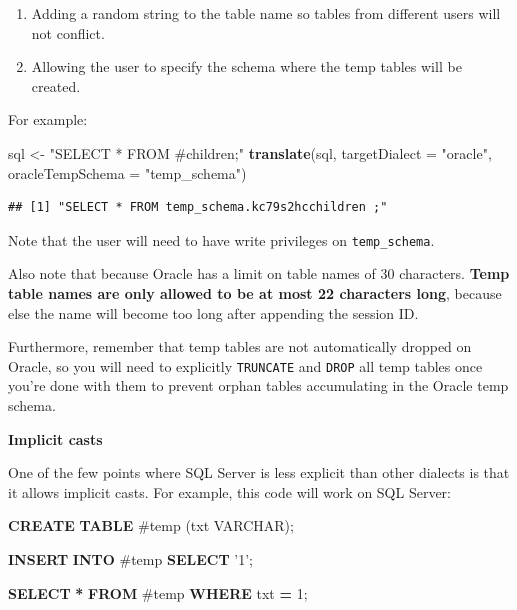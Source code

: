 \documentclass[11pt]{book}
\newenvironment{Shaded}{\begin{snugshade}}{\end{snugshade}}
\newcommand{\DataTypeTok}[1]{\textcolor[rgb]{0.13,0.29,0.53}{#1}}
\newcommand{\DecValTok}[1]{\textcolor[rgb]{0.00,0.00,0.81}{#1}}
\newcommand{\KeywordTok}[1]{\textcolor[rgb]{0.13,0.29,0.53}{\textbf{#1}}}
\newcommand{\NormalTok}[1]{#1}
\newcommand{\OperatorTok}[1]{\textcolor[rgb]{0.81,0.36,0.00}{\textbf{#1}}}
\newcommand{\StringTok}[1]{\textcolor[rgb]{0.31,0.60,0.02}{#1}}
\providecommand{\tightlist}{%
  \setlength{\itemsep}{0pt}\setlength{\parskip}{0pt}}
\theoremstyle{definition}
\theoremstyle{definition}
\theoremstyle{definition}
\theoremstyle{remark}
\begin{document}
\begin{enumerate}
\def\labelenumi{\arabic{enumi}.}
\tightlist
\item
  Adding a random string to the table name so tables from different users will not conflict.
\item
  Allowing the user to specify the schema where the temp tables will be created.
\end{enumerate}

For example:

\begin{Shaded}
\begin{Highlighting}[]
\NormalTok{sql <-}\StringTok{ "SELECT * FROM #children;"}
\KeywordTok{translate}\NormalTok{(sql, }\DataTypeTok{targetDialect =} \StringTok{"oracle"}\NormalTok{, }\DataTypeTok{oracleTempSchema =} \StringTok{"temp_schema"}\NormalTok{)}
\end{Highlighting}
\end{Shaded}

\begin{verbatim}
## [1] "SELECT * FROM temp_schema.kc79s2hcchildren ;"
\end{verbatim}

Note that the user will need to have write privileges on \texttt{temp\_schema}.

Also note that because Oracle has a limit on table names of 30 characters. \textbf{Temp table names are only allowed to be at most 22 characters long}, because else the name will become too long after appending the session ID.

Furthermore, remember that temp tables are not automatically dropped on Oracle, so you will need to explicitly \texttt{TRUNCATE} and \texttt{DROP} all temp tables once you're done with them to prevent orphan tables accumulating in the Oracle temp schema.

\textbf{Implicit casts}

One of the few points where SQL Server is less explicit than other dialects is that it allows implicit casts. For example, this code will work on SQL Server:

\begin{Shaded}
\begin{Highlighting}[]
\KeywordTok{CREATE} \KeywordTok{TABLE}\NormalTok{ #temp (txt }\DataTypeTok{VARCHAR}\NormalTok{);}

\KeywordTok{INSERT} \KeywordTok{INTO}\NormalTok{ #temp}
\KeywordTok{SELECT} \StringTok{'1'}\NormalTok{;}

\KeywordTok{SELECT} \OperatorTok{*} \KeywordTok{FROM}\NormalTok{ #temp }\KeywordTok{WHERE}\NormalTok{ txt }\OperatorTok{=} \DecValTok{1}\NormalTok{;}
\end{Highlighting}
\end{Shaded}
\end{document}
